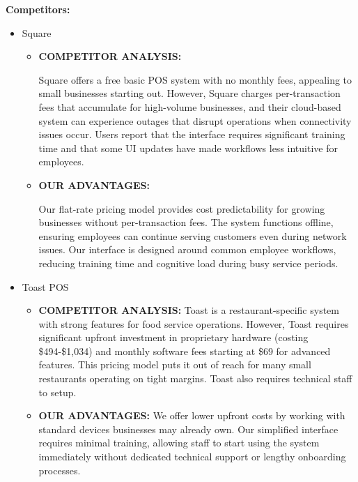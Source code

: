 \documentclass[]{VUMIFTemplateClass}
\begin{document}
\textbf{Competitors:}

\begin{itemize}
    \item Square
\begin{itemize}
        \item \textbf{COMPETITOR ANALYSIS:}
        
        Square offers a free basic POS system with no monthly fees, appealing to
        small businesses starting out. However, Square charges per-transaction
        fees that accumulate for high-volume businesses, and their cloud-based
        system can experience outages that disrupt operations when connectivity
        issues occur. Users report that the interface requires significant
        training time and that some UI updates have made workflows less
        intuitive for employees.

        \item {\textbf{OUR ADVANTAGES:} 
        
        Our flat-rate pricing model provides cost predictability for growing
        businesses without per-transaction fees. The system functions offline,
        ensuring employees can continue serving customers even during network
        issues. Our interface is designed around common employee workflows,
        reducing training time and cognitive load during busy service periods.}

    \end{itemize}
    

    \item {Toast POS}
    \begin{itemize}
        \item  \textbf{COMPETITOR ANALYSIS:}
        Toast is a restaurant-specific system with strong
        features for food service operations. However, Toast requires significant
        upfront investment in proprietary hardware (costing \$494-\$1,034) and monthly
        software fees starting at \$69 for advanced features. This pricing model
        puts it out of reach for many small restaurants operating on tight margins.
        Toast also requires technical staff to setup.

        \item  \textbf{OUR ADVANTAGES:} 
        We offer lower upfront costs by working with
        standard devices businesses may already own. Our simplified interface
        requires minimal training, allowing staff to start using the system
        immediately without dedicated technical support or lengthy onboarding
        processes.
    \end{itemize}
    

\end{itemize}
\end{document}
